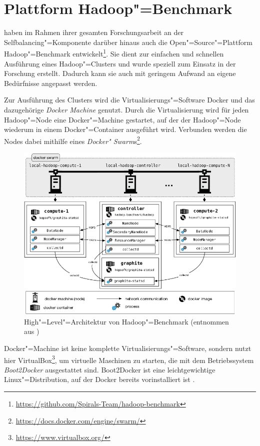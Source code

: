 \section{Plattform Hadoop"=Benchmark}
\label{sec:hadoopBenchmark}

\citeauthor{Zhang2016} haben im Rahmen ihrer gesamten Forschungsarbeit an der Selfbalancing"=Komponente darüber hinaus auch die Open"=Source"=Plattform Hadoop"=Benchmark entwickelt\footnote{\url{https://github.com/Spirals-Team/hadoop-benchmark}}.
Sie dient zur einfachen und schnellen Ausführung eines Hadoop"=Clusters und wurde speziell zum Einsatz in der Forschung erstellt.
Dadurch kann sie auch mit geringem Aufwand an eigene Bedürfnisse angepasst werden.

Zur Ausführung des Clusters wird die Virtualisierungs"=Software Docker und das dazugehörige \emph{Docker Machine} genutzt.
Durch die Virtualisierung wird für jeden Hadoop"=Node eine Docker"=Machine gestartet, auf der der Hadoop"=Node wiederum in einem Docker"=Container ausgeführt wird.
Verbunden werden die Nodes dabei mithilfe eines \emph{Docker" Swarm}s\footnote{\url{https://docs.docker.com/engine/swarm/}}.

\begin{figure}[h]
    \includegraphics{./resources/hadoopBenchmarkArch.png}
    \caption[High"=Level"=Architektur von Hadoop"=Benchmark]
    {High"=Level"=Architektur von Hadoop"=Benchmark (entnommen aus \cite{abb:hadoopBenchmarkArch})}
    \label{fig:hadoopBenchmarkArchitecture}
\end{figure}

Docker"=Machine ist keine komplette Virtualisierungs"=Software, sondern nutzt hier VirtualBox\footnote{\url{https://www.virtualbox.org/}}, um virtuelle Maschinen zu starten, die mit dem Betriebssystem \emph{Boot2Docker} ausgestattet sind.
Boot2Docker ist eine leichtgewichtige Linux"=Distribution, auf der Docker bereits vorinstalliert ist \cite{DockerMachineGettingStartedVm}.

